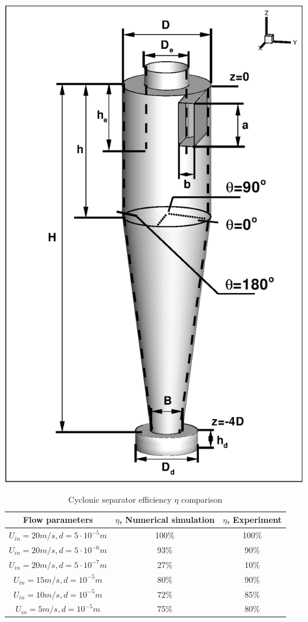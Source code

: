 \documentclass[a4paper]{jpconf}
\begin{document}
  \begin{minipage}{0.35\textwidth}
    \includegraphics[scale=0.45]{cycloneGeometryTeta}
	\label{fig:cycloneGeometryScheme}
  \end{minipage}
\begin{table}[h]
\begin{center}
		\caption{Cyclonic separator efficiency $\eta$ comparison}
		\label{tableSolution}
		\begin{tabular}{|c|c|c|}
			\hline
			Flow parameters & $\eta$, Numerical simulation & $\eta$, Experiment\\
			\hline
			$U_{in}=20m/s, d=5 \cdot 10^{-5}m$ & 100\% & 100\% \\
			\hline
			$U_{in}=20m/s, d=5 \cdot 10^{-6}m$ & 93\% & 90\%\\
			\hline
			$U_{in}=20m/s, d=5 \cdot 10^{-7}m$ & 27\% & 10\%\\
			\hline
			$U_{in}=15m/s, d=10^{-5}m$ & 80\% & 90\% \\
			\hline
			$U_{in}=10m/s, d=10^{-5}m$ & 72\% & 85\% \\
			\hline
			$U_{in}=5m/s, d=10^{-5}m$ & 75\% & 80\% \\
			\hline
		\end{tabular}
\end{center}
	\end{table}
\end{document}
